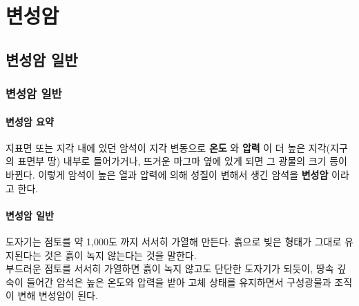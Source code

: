 \documentclass[12pt, a4paper, twoside]{book}
\begin{document}
	
	
		\part{변성암}
	



	\clearpage
	\chapter{변성암 일반}
	\minitoc				%





	\clearpage
	\section{변성암 일반}
	

		\subsection{변성암 요약}

				지표면 또는 지각 내에 있던 암석이 지각 변동으로 \textbf{ 온도 }와 \textbf{ 압력 }이 더 높은 지각(지구의 표면부 땅) 내부로 들어가거나, 뜨거운 마그마 옆에 있게 되면 그 광물의 크기 등이 바뀐다. 
				이렇게 암석이 높은 열과 압력에 의해 성질이 변해서 생긴 암석을 \textbf{ 변성암 }이라고 한다.


		\subsection{변성암 일반}
	

				도자기는 점토를 약 1,000도 까지 서서히 가열해 만든다. 흙으로 빚은 형태가 그대로 유지된다는 것은 흙이 녹지 않는다는 것을 말한다.   \\

				부드러운 점토를 서서히 가열하면 흙이 녹지 않고도 단단한 도자기가 되듯이, 땅속 깊숙이 들어간 암석은 높은 온도와 압력을 받아 고체 상태를 유지하면서 구성광물과 조직이 변해 변성암이 된다.  \\
\end{document}
